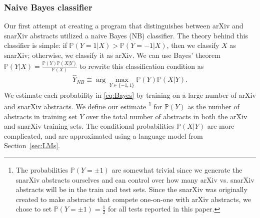 \documentclass{article}
\renewcommand{\P}{\mathbb{P}}
\begin{document}
\subsubsection{Naive Bayes classifier}
Our first attempt at creating a program that distinguishes between arXiv and snarXiv abstracts utilized a naive Bayes (NB) classifier.
The theory behind this classifier is simple: if $\P(Y=1|X) > \P(Y=-1|X)$, then we classify $X$ as snarXiv; otherwise, we classify it as arXiv.
We can use Bayes' theorem $\P(Y|X) = \frac{\P(Y)\P(X|Y)}{\P(X)}$ to rewrite this classification condition as
%
\begin{align}
	\widehat{Y}_{NB} \equiv \arg\max_{Y\in\{-1,1\}} \P(Y)\P(X|Y). \label{eq:Bayes}
\end{align}
%
We estimate each probability in \eqref{eq:Bayes} by training on a large number of arXiv and snarXiv abstracts.
We define our estimate%
\footnote{The probabilities $\P(Y=\pm1)$ are somewhat trivial since we generate the snarXiv abstracts ourselves and can control over how many arXiv vs. snarXiv abstracts will be in the train and test sets. Since the snarXiv was originally created to make abstracts that compete one-on-one with arXiv abstracts, we chose to set $\P(Y=\pm1)=\tfrac{1}{2}$ for all tests reported in this paper.}
%
for $\P(Y)$ as the number of abstracts in training set $Y$ over the total number of abstracts in both the arXiv and snarXiv training sets.
The conditional probabilities $\P(X|Y)$ are more complicated, and are approximated using a language model from Section~\ref{sec:LMs}.
\end{document}
